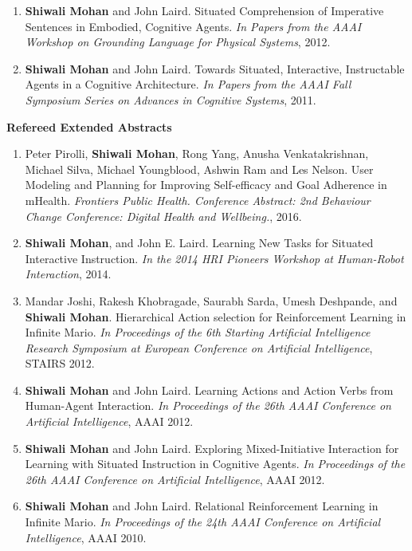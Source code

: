 \documentclass[margin,line,11pt]{res}
\begin{document}
\begin{resume}
\begin{enumerate}[label=\lbrack W\arabic*\rbrack:,leftmargin=*]
\item \textbf{Shiwali Mohan} and John Laird. Situated Comprehension of Imperative Sentences in Embodied, Cognitive Agents. \emph{In Papers from the AAAI Workshop on Grounding Language for Physical Systems}, 2012.
  
\item \textbf{Shiwali Mohan} and John Laird. Towards Situated, Interactive, Instructable Agents in a Cognitive Architecture. \emph{In Papers from the AAAI Fall Symposium Series on Advances in Cognitive Systems}, 2011.
\end{enumerate}

\textbf{Refereed Extended Abstracts}
\begin{enumerate}[label=\lbrack A\arabic*\rbrack,leftmargin=*]
\item Peter Pirolli, \textbf{Shiwali Mohan}, Rong Yang, Anusha Venkatakrishnan, Michael Silva, Michael Youngblood, Ashwin Ram and Les Nelson. User Modeling and Planning for Improving Self-efficacy and Goal Adherence in mHealth. \emph{Frontiers Public Health. Conference Abstract: 2nd Behaviour Change Conference: Digital Health and Wellbeing.}, 2016.
\item \textbf{Shiwali Mohan}, and John E. Laird. Learning New Tasks for Situated Interactive Instruction. \emph{In the 2014 HRI Pioneers Workshop at Human-Robot Interaction}, 2014.
\item Mandar Joshi, Rakesh Khobragade, Saurabh Sarda, Umesh Deshpande, and \textbf{Shiwali Mohan}. Hierarchical Action selection for Reinforcement Learning in Infinite Mario. \emph{In Proceedings of the 6th Starting Artificial Intelligence Research Symposium at European Conference on Artificial Intelligence}, STAIRS 2012.

\item \textbf{Shiwali Mohan} and John Laird. Learning Actions and Action Verbs from Human-Agent Interaction. \emph{In Proceedings of the 26th AAAI Conference on Artificial Intelligence}, AAAI 2012.

\item \textbf{Shiwali Mohan} and John Laird. Exploring Mixed-Initiative Interaction for Learning with Situated Instruction in Cognitive Agents. \emph{In Proceedings of the 26th AAAI Conference on Artificial Intelligence}, AAAI 2012.

\item \textbf{Shiwali Mohan} and John Laird. Relational Reinforcement Learning in Infinite Mario. \emph{In Proceedings of the 24th AAAI Conference on Artificial Intelligence}, AAAI 2010.
\end{enumerate}



\end{resume}
\end{document}
